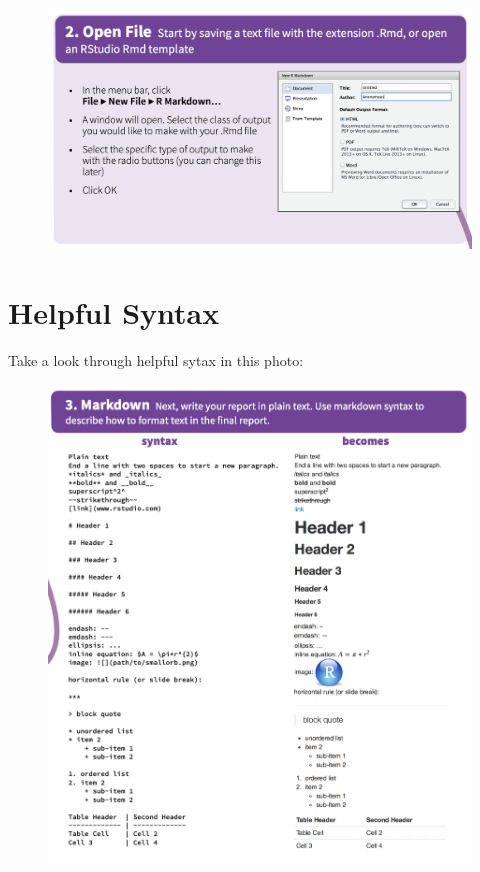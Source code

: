\documentclass[]{book}
\begin{document}
\begin{figure}
\centering
\includegraphics{images/open.png}
\caption{}
\end{figure}

\section{Helpful Syntax}\label{helpful-syntax}

Take a look through helpful sytax in this photo:

\begin{figure}
\centering
\includegraphics{images/syntax.png}
\caption{}
\end{figure}
\end{document}
